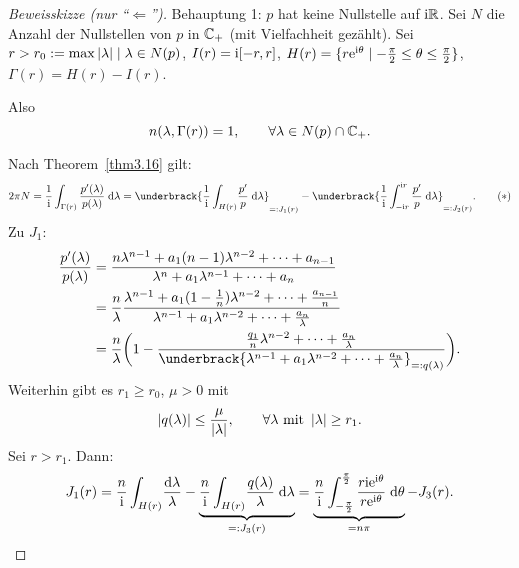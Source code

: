 \documentclass[a4paper,twoside,DIV15,BCOR12mm]{scrbook}
\begin{document}
\begin{proof}[Beweisskizze (nur "`$\Leftarrow$"')]
  Behauptung 1: $p$ hat keine Nullstelle auf $\mathrm{i}\mathbb{R}$. Sei $N$ die Anzahl der Nullstellen von $p$ in $\mathbb{C}_+$ (mit Vielfachheit
  gezählt). Sei $r>r_0:=\max{\left\lvert\lambda\right\lvert\mid\lambda\in N(p)}$, $I(r)=\mathrm{i}[-r,r]$,
  $H(r)=\{r\mathrm{e}^{\mathrm{i}\theta}\mid-\frac\pi2\leq\theta\leq\frac\pi2\}$, $\Gamma(r)=H(r)-I(r)$.

\begin{center}
\end{center}

Also
\[n(\lambda,\Gamma(r)) = 1,\qquad\forall\lambda\in N(p)\cap\mathbb{C}_+.\]

Nach Theorem~\ref{thm3.16} gilt:
\[\label{3.20*} 2\pi N = \frac{1}{\i}\integral{\Gamma(r)}{}{\frac{p^\prime(\lambda)}{p(\lambda)}}{\lambda} = \underbrack{\frac{1}{\i}\integral{H(r)}{}{\!\frac{p^\prime}{p}}{\lambda}}_{\ad J_1(r)} - \underbrack{\frac{1}{\i}\integral{-\i r}{\i r}{\frac{p^\prime}{p}}{\lambda}}_{\ad J_2(r)}.\tag{$*$}\]
Zu $J_1$:
\begin{align*}
\frac{p^\prime(\lambda)}{p(\lambda)} &= \frac{n\lambda^{n-1}+a_1(n-1)\lambda^{n-2}+\dotsb+a_{n-1}}{\lambda^n+a_1\lambda^{n-1}+\dotsb+a_n}\\
&= \frac{n}{\lambda}\frac{\lambda^{n-1}+a_1(1-\frac{1}{n})\lambda^{n-2}+\dotsb+\frac{a_{n-1}}{n}}{\lambda^{n-1}+a_1\lambda^{n-2}+\dotsb+\frac{a_n}{\lambda}}\\
&= \frac{n}{\lambda}\biggl(1-\frac{\frac{q_1}{n}\lambda^{n-2}+\dotsb+\frac{a_n}{\lambda}}{\underbrack{\lambda^{n-1}+a_1\lambda^{n-2}+\dotsb+\tfrac{a_n}{\lambda}}_{\ad q(\lambda)}}\biggr).
\end{align*}
Weiterhin gibt es $r_1\geq r_0$, $\mu > 0$ mit
\[\left\lvert q(\lambda)\right\lvert\leq\frac{\mu}{\left\lvert\lambda\right\lvert},\qquad\forall\lambda\text{ mit }\left\lvert\lambda\right\lvert\geq r_1.\]
Sei $r>r_1$. Dann:
\[J_1(r) = \frac{n}{\mathrm{i}}\int_{H(r)}\!\frac{\mathrm{d}\lambda}{\lambda} - \underbrace{\frac{n}{\mathrm{i}}\int_{H(r)}^{}{\!\frac{q(\lambda)}{\lambda}}\;\mathrm{d}\lambda}_{=: J_3(r)} = \underbrace{\frac{n}{\mathrm{i}}\int_{-\frac{\pi}{2}}^{\frac{\pi}{2}}{\frac{r\mathrm{i}\mathrm{e}^{\mathrm{i}\theta}}{r\mathrm{e}^{\mathrm{i}\theta}}}\;\mathrm{d}\theta}_{=n\pi} - J_3(r).\]


\end{proof}
\end{document}
